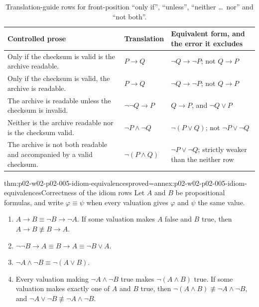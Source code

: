 \begin{table}[htbp]
\centering
\small
\caption{Translation-guide rows for front-position ``only if'', ``unless'',
``neither \dots\ nor'' and ``not both''.}
\label{tab:p02-w02-p02-005-idioms}
\begin{tabular}{@{}p{}p{}p{}@{}}
\toprule
Controlled prose & Translation & Equivalent form, and the error it excludes \\
\midrule
Only if the checksum is valid is the archive readable. & \(P\to Q\) &
\(\neg Q\to\neg P\); not \(Q\to P\) \\
Only if the checksum is valid, the archive is readable. & \(P\to Q\) &
\(\neg Q\to\neg P\); not \(Q\to P\) \\
The archive is readable unless the checksum is invalid. & \(\neg\neg Q\to P\) &
\(Q\to P\), and \(\neg Q\lor P\) \\
Neither is the archive readable nor is the checksum valid. &
\(\neg P\land\neg Q\) & \(\neg(P\lor Q)\); not \(\neg P\lor\neg Q\) \\
The archive is not both readable and accompanied by a valid checksum. &
\(\neg(P\land Q)\) & \(\neg P\lor\neg Q\); strictly weaker than the
neither row \\
\bottomrule
\end{tabular}
\end{table}

\begin{hbtheorem}{thm:p02-w02-p02-005-idiom-equivalences}{proved=annex:p02-w02-p02-005-idiom-equivalences}{Correctness of the idiom rows}
Let \(A\) and \(B\) be propositional formulas, and write
\(\varphi\equiv\psi\) when every valuation gives \(\varphi\) and \(\psi\)
the same value.
\begin{enumerate}
\item \(A\to B\equiv\neg B\to\neg A\).  If some valuation makes \(A\) false
      and \(B\) true, then \(A\to B\not\equiv B\to A\).
\item \(\neg\neg B\to A\equiv B\to A\equiv\neg B\lor A\).
\item \(\neg A\land\neg B\equiv\neg(A\lor B)\).
\item Every valuation making \(\neg A\land\neg B\) true makes
      \(\neg(A\land B)\) true.  If some valuation makes exactly one of
      \(A\) and \(B\) true, then \(\neg(A\land B)\not\equiv\neg A\land\neg B\),
      and \(\neg A\lor\neg B\not\equiv\neg A\land\neg B\).
\end{enumerate}
\end{hbtheorem}

